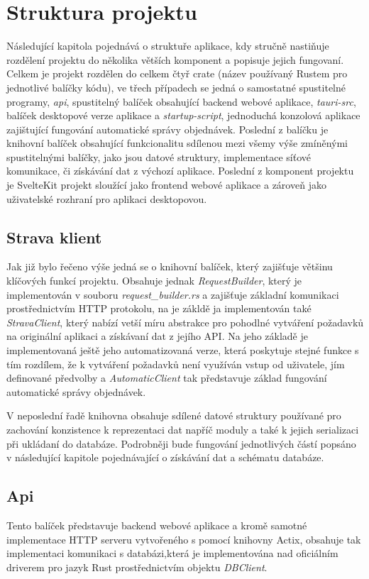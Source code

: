 \documentclass[12pt]{article}
\begin{document}
\section{Struktura projektu}
Následující kapitola pojednává o struktuře aplikace, kdy stručně nastiňuje rozdělení projektu do několika větších komponent a popisuje jejich fungovaní.
Celkem je projekt rozdělen do celkem čtyř crate (název používaný Rustem pro jednotlivé balíčky kódu), ve třech případech se jedná o samostatné spustitelné programy, \textit{api}, spustitelný balíček obsahující backend webové aplikace, \textit{tauri-src}, balíček desktopové verze aplikace a \textit{startup-script}, jednoduchá konzolová aplikace zajištující fungování automatické správy objednávek. Poslední z balíčku je knihovní balíček obsahující funkcionalitu sdílenou mezi všemy výše zmíněnými spustitelnými balíčky, jako jsou datové struktury, implementace síťové komunikace, či získávání dat z výchozí aplikace. Poslední z komponent projektu je SvelteKit projekt sloužící jako frontend webové aplikace a zároveň jako uživatelské rozhraní pro aplikaci desktopovou.
\subsection{Strava klient}
Jak již bylo řečeno výše jedná se o knihovní balíček, který zajišťuje většinu klíčových funkcí projektu. Obsahuje jednak \textit{RequestBuilder}, který je implementován v souboru \textit{request\_builder.rs} a zajišťuje základní komunikaci prostřednictvím HTTP protokolu, na je zákldě ja implementován také \textit{StravaClient}, který nabízí vetší míru abstrakce pro pohodlné vytváření požadavků na originální aplikaci a získávaní dat z jejího API. Na jeho základě je implementovaná ještě jeho automatizovaná verze, která poskytuje stejné funkce s tím rozdílem, že k vytváření požadavků není využíván vstup od uživatele, jím definované předvolby a \textit {AutomaticClient} tak představuje základ fungování automatické správy objednávek.

V neposlední řadě knihovna obsahuje sdílené datové struktury používané pro zachování konzistence k reprezentaci dat napříč moduly a také k jejich serializaci při ukládaní do databáze. Podrobněji bude fungování jednotlivých částí popsáno v následující kapitole pojednávající o získávání dat a schématu databáze.
\subsection{Api}
Tento balíček představuje backend webové aplikace a kromě samotné implementace HTTP serveru vytvořeného s pomocí knihovny Actix, obsahuje tak implementaci komunikaci s databázi,která je implementována nad oficiálním driverem pro jazyk Rust prostřednictvím objektu \textit{DBClient}.
\end{document}
